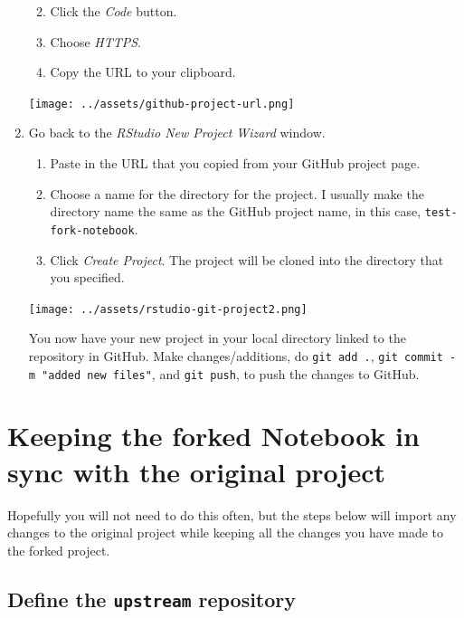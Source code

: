 \documentclass[
  letterpaper,
  DIV=11,
  numbers=noendperiod]{scrreprt}
\providecommand{\tightlist}{%
  \setlength{\itemsep}{0pt}\setlength{\parskip}{0pt}}\usepackage{longtable,booktabs,array}
\begin{document}
\begin{enumerate}
  \begin{enumerate}
  \def\labelenumii{\arabic{enumii}.}
  \tightlist
  \item
    Click the \emph{Code} button.
  \item
    Choose \emph{HTTPS}.
  \item
    Copy the URL to your clipboard.
  \end{enumerate}

  \begin{center}
  \texttt{[image: ../assets/github-project-url.png]}
  \end{center}
\item
  Go back to the \emph{RStudio New Project Wizard} window.

  \begin{enumerate}
  \def\labelenumii{\arabic{enumii}.}
  \tightlist
  \item
    Paste in the URL that you copied from your GitHub project page.
  \item
    Choose a name for the directory for the project. I usually make the
    directory name the same as the GitHub project name, in this case,
    \texttt{test-fork-notebook}.
  \item
    Click \emph{Create Project}. The project will be cloned into the
    directory that you specified.
  \end{enumerate}

  \begin{center}
  \texttt{[image: ../assets/rstudio-git-project2.png]}
  \end{center}

  You now have your new project in your local directory linked to the
  repository in GitHub. Make changes/additions, do \texttt{git\ add\ .},
  \texttt{git\ commit\ -m\ "added\ new\ files"}, and \texttt{git\ push},
  to push the changes to GitHub.
\end{enumerate}

\section{Keeping the forked Notebook in sync with the original
project}\label{keeping-the-forked-notebook-in-sync-with-the-original-project}

Hopefully you will not need to do this often, but the steps below will
import any changes to the original project while keeping all the changes
you have made to the forked project.

\subsection{\texorpdfstring{Define the \texttt{upstream}
repository}{Define the upstream repository}}\label{define-the-upstream-repository}
\end{document}
